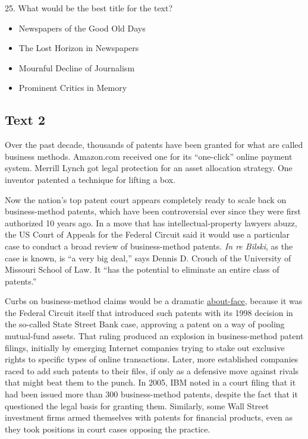 \documentclass[UTF8,11pt]{ctexart}
\begin{document}
25. What would be the best title for the text?


\begin{itemize}[leftmargin=2em,itemsep=.2em,topsep=.4em]\item[A.] Newspapers of the Good Old Days
\item[B.] The Lost Horizon in Newspapers
\item[C.] Mournful Decline of Journalism
\item[D.] Prominent Critics in Memory
\end{itemize}

\subsection*{\textbf{Text 2}}


Over the past decade, thousands of patents have been granted for what are called business methods. Amazon.com received one for its “one-click” online payment system. Merrill Lynch got legal protection for an asset allocation strategy. One inventor patented a technique for lifting a box.


Now the nation’s top patent court appears completely ready to scale back on business-method patents, which have been controversial ever since they were first authorized 10 years ago. In a move that has intellectual-property lawyers abuzz, the US Court of Appeals for the Federal Circuit said it would use a particular case to conduct a broad review of business-method patents. \textit{In re Bilski}, as the case is known, is “a very big deal,” says Dennis D. Crouch of the University of Missouri School of Law. It “has the potential to eliminate an entire class of patents.”


Curbs on business-method claims would be a dramatic \uline{about-face}, because it was the Federal Circuit itself that introduced such patents with its 1998 decision in the so-called State Street Bank case, approving a patent on a way of pooling mutual-fund assets. That ruling produced an explosion in business-method patent filings, initially by emerging Internet companies trying to stake out exclusive rights to specific types of online transactions. Later, more established companies raced to add such patents to their files, if only as a defensive move against rivals that might beat them to the punch. In 2005, IBM noted in a court filing that it had been issued more than 300 business-method patents, despite the fact that it questioned the legal basis for granting them. Similarly, some Wall Street investment firms armed themselves with patents for financial products, even as they took positions in court cases opposing the practice.
\end{document}
